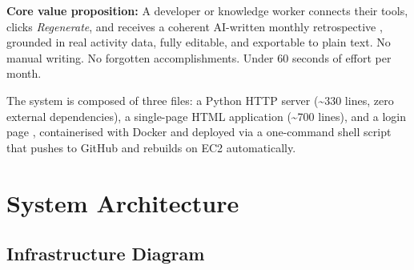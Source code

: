 \documentclass[12pt,a4paper]{article}
\begin{document}
\begin{tcolorbox}[tip]
\textbf{Core value proposition:} A developer or knowledge worker connects their tools, clicks \textit{Regenerate}, and receives a coherent AI-written monthly retrospective , grounded in real activity data, fully editable, and exportable to plain text. No manual writing. No forgotten accomplishments. Under 60 seconds of effort per month.
\end{tcolorbox}

The system is composed of three files: a Python HTTP server (\textasciitilde330 lines, zero external dependencies), a single-page HTML application (\textasciitilde700 lines), and a login page , containerised with Docker and deployed via a one-command shell script that pushes to GitHub and rebuilds on EC2 automatically.

\section{System Architecture}

\subsection{Infrastructure Diagram}
\end{document}
